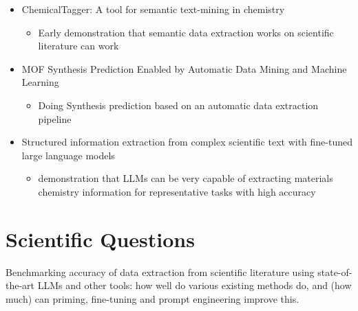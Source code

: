 \documentclass[a4paper,12pt]{article}
\begin{document}
\begin{itemize}
    \item ChemicalTagger: A tool for semantic text-mining in chemistry \cite{hawizy_chemicaltagger_2011}
        \begin{itemize}
            \item Early demonstration that semantic data extraction works on scientific literature can work
        \end{itemize}
    \item MOF Synthesis Prediction Enabled by Automatic Data Mining and Machine Learning \cite{luo_mof_2022}
        \begin{itemize}
            \item Doing Synthesis prediction based on an automatic data extraction pipeline
        \end{itemize}
    \item Structured information extraction from complex scientific text with fine-tuned large language models \cite{dunn_structured_2022}
        \begin{itemize}
            \item demonstration that LLMs can be very capable of extracting materials chemistry information for representative tasks with high accuracy
        \end{itemize}
\end{itemize}

\section{Scientific Questions}
Benchmarking accuracy of data extraction from scientific literature using state-of-the-art LLMs and other tools: how well do various existing methods do, and (how much) can priming, fine-tuning and prompt engineering improve this.
\end{document}
